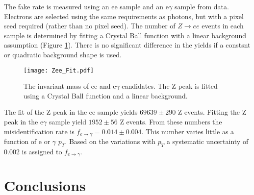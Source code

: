 The fake rate is measured using an ee sample and an e$\gamma$ sample from data.
Electrons are selected using the same requirements as photons, but with a pixel
seed required (rather than no pixel seed). The number of $Z\rightarrow ee$
events in each sample is determined by fitting a Crystal Ball function with a
linear background assumption (Figure \ref{fig:Zee_Fit}). There is no significant
difference in the yields if a constsnt or quadratic background shape is used. \\

\begin{figure}
\begin{center}
\texttt{[image: Zee\_Fit.pdf]}
\end{center}
\caption{The invariant mass of ee and e$\gamma$ candidates. The Z peak is fitted
using a Crystal Ball function and a linear background.}
\label{fig:Zee_Fit}
\end{figure}

The fit of the Z peak in the ee sample yields $69639 \pm 290$ Z events. Fitting
the Z peak in the e$\gamma$ sample yield $1952\pm56$ Z events. From these
numbers the misidentification rate is $f_{e\rightarrow\gamma} = 0.014\pm0.004$.
This number varies little as a function of e or $\gamma$ $p_{T}$. Based on the
variations with $p_{T}$ a systematic uncertainty of 0.002 is assigned to
$f_{e\rightarrow\gamma}$. 

\section{Conclusions}
